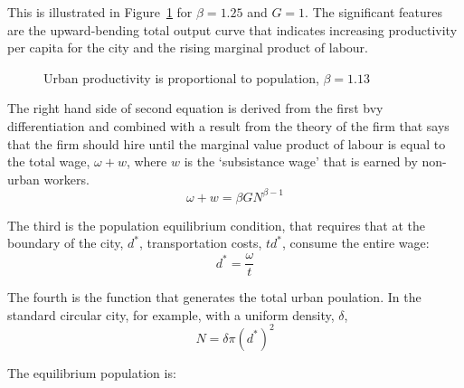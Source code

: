 This is illustrated in Figure~\ref{fig-scale-output} for $\beta=1.25$ and $G=1$. The significant features are the upward-bending total output curve that indicates increasing productivity per capita for the city and the rising marginal product of labour.

\begin{figure}[htb]
    \begin{center}
    \vspace{.5cm}
    \caption{Urban productivity is proportional to population, $\beta=1.13$}
    \label{fig-scale-output}
    \end{center}
\end{figure}

The right hand side of second equation is derived from the first bvy differentiation and combined with a result from the theory of the firm that says that the firm should hire until the marginal value product of labour is equal to the total wage, $\omega+w$, where $w$ is the `subsistance wage' that is earned by non-urban workers.  
\[\omega+w = \beta GN^{\beta-1}\]

The third is the population equilibrium condition, that requires that at the boundary of the city, $d^*$,  transportation costs, $td^*$, consume the entire wage:
 \[d^*=\frac{\omega}{t}\]

 The fourth is the function that generates the total urban poulation. In the standard circular city, for example, with a uniform density, $\delta$,  
 \[N=\delta\pi (d^*)^2\]
 
 The equilibrium population  is: 

